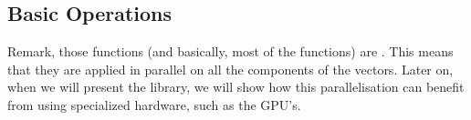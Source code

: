 \documentclass[letterpaper,10pt,english]{jupyterBook}
\begin{document}
\subsection{Basic Operations}
\label{\detokenize{01:basic-operations}}
\begin{sphinxShadowBox}
\sphinxstylesidebartitle{}

\sphinxAtStartPar
Remark, those functions (and basically, most of the  functions) are . This means that they are applied in parallel on all the components of the vectors. Later on, when we will present the  library, we will show how this parallelisation can benefit from using specialized hardware, such as the GPU’s.
\end{sphinxShadowBox}
\end{document}
